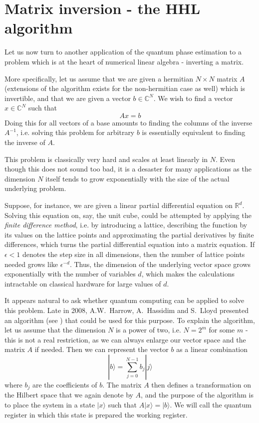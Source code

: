 \documentclass[a4paper, draft]{article}
\theoremstyle{own}
\theoremstyle{remark}
\newcommand{\R}{\mathbb{R}}
\newcommand{\C}{\mathbb{C}}
\begin{document}
\section{Matrix inversion - the HHL algorithm}


Let us now turn to another application of the quantum phase estimation to a problem which is at the heart of numerical linear algebra - inverting a matrix.

More specifically, let us assume that we are given a hermitian $N \times N$ matrix $A$ (extensions of the algorithm exists for the non-hermitian case as well) which is invertible, and that we are given a vector $b \in \C^N$. We wish to find a vector $x \in \C^N$ such that
$$
Ax = b
$$ 
Doing this for all vectors of a base amounts to finding the columns of the inverse $A^{-1}$, i.e. solving this problem for arbitrary $b$ is essentially equivalent to finding the inverse of $A$. 

This problem is classically very hard and scales at least linearly in $N$. Even though this does not sound too bad, it is a desaster for many applications as the dimension $N$ itself tends to grow exponentially with the size of the actual underlying problem.
 
Suppose, for instance, we are given a linear partial differential equation on $\R^d$. Solving this equation on, say, the unit cube, could be attempted by applying the \emph{finite difference method}, i.e. by introducing a lattice, describing the function by its values on the lattice points and approximating the partial derivatives by finite differences, which turns the partial differential equation into a matrix equation. If $\epsilon < 1$ denotes the step size in all dimensions, then the number of lattice points needed grows like $\epsilon^{-d}$. Thus, the dimension of the underlying vector space grows exponentially with the number of variables $d$, which makes the calculations intractable on classical hardware for large values of $d$.

It appears natural to ask whether quantum computing can be applied to solve this problem. Late in 2008, A.W.~Harrow, A.~Hassidim and S.~Lloyd presented an algorithm (see \cite{HHL2009}) that could be used for this purpose. To explain the algorithm, let us assume that the dimension $N$ is a power of two, i.e. $N = 2^m$ for some $m$ - this is not a real restriction, as we can always enlarge our vector space and the matrix $A$ if needed. Then we can represent the vector $b$ as a linear combination
$$
|b \rangle = \sum_{j=0}^{N-1} b_j |j \rangle
$$
where $b_j$ are the coefficients of $b$. The matrix $A$ then defines a transformation on the Hilbert space that we again denote by $A$, and the purpose of the algorithm is to place the system in a state $|x \rangle$ such that $A |x \rangle = |b \rangle$. We will call the quantum register in which this state is prepared the working register.
\end{document}
